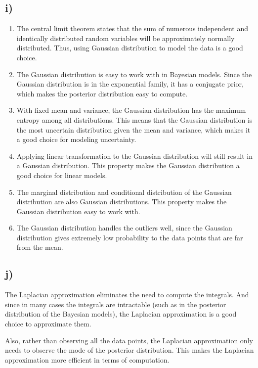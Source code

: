 \documentclass[a4paper,12pt]{article}
\begin{document}
\subsection*{i)}

\begin{enumerate}
	\item The central limit theorem states that the sum of numerous independent and identically distributed random variables will be approximately normally distributed. Thus, using Gaussian distribution to model the data is a good choice.
	\item The Gaussian distribution is easy to work with in Bayesian models. Since the Gaussian distribution is in the exponential family, it has a conjugate prior, which makes the posterior distribution easy to compute.
	\item With fixed mean and variance, the Gaussian distribution has the maximum entropy among all distributions. This means that the Gaussian distribution is the most uncertain distribution given the mean and variance, which makes it a good choice for modeling uncertainty.
	\item Applying linear transformation to the Gaussian distribution will still result in a Gaussian distribution. This property makes the Gaussian distribution a good choice for linear models.
	\item The marginal distribution and conditional distribution of the Gaussian distribution are also Gaussian distributions. This property makes the Gaussian distribution easy to work with.
	\item The Gaussian distribution handles the outliers well, since the Gaussian distribution gives extremely low probability to the data points that are far from the mean.
\end{enumerate}

\subsection*{j)}

The Laplacian approximation eliminates the need to compute the integrals. And since in many cases the integrals are intractable (such as in the posterior distribution of the Bayesian models), the Laplacian approximation is a good choice to approximate them.

Also, rather than observing all the data points, the Laplacian approximation only needs to observe the mode of the posterior distribution. This makes the Laplacian approximation more efficient in terms of computation.
\end{document}
